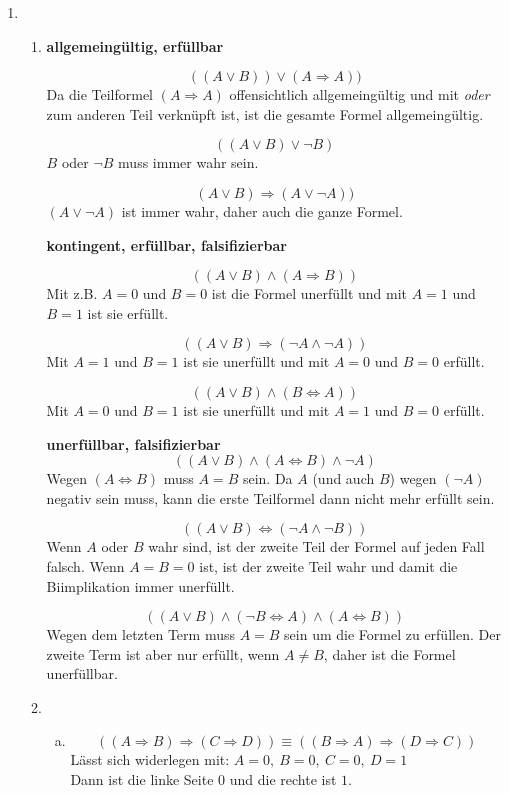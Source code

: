 \documentclass[a4paper]{scrartcl}
\title{\titleinfo}
\author{Arne Feil}
\date{\today}
\newcommand{\aufgabe}[1]{\item[\textbf{#1}]}
\begin{document}
\begin{enumerate}

\aufgabe{6.3}
\begin{enumerate}[1.]
 \item

  \textbf{allgemeingültig, erfüllbar}

  $$((A\vee B))\vee (A\Rightarrow A))$$
  Da die Teilformel $(A\Rightarrow A)$ offensichtlich allgemeingültig und mit \textit{oder} zum anderen Teil verknüpft ist, ist die gesamte Formel allgemeingültig.

  $$((A\vee B)\vee\neg B)$$
  $B$ oder $\neg B$ muss immer wahr sein.

  $$(A\vee B)\Rightarrow(A\vee\neg A))$$
  $(A\vee\neg A)$ ist immer wahr, daher auch die ganze Formel.

  \textbf{kontingent, erfüllbar, falsifizierbar}

  $$((A\vee B)\wedge(A\Rightarrow B))$$
  Mit z.B. $A=0$ und $B=0$ ist die Formel unerfüllt und mit $A=1$ und $B=1$ ist sie erfüllt.

  $$((A\vee B)\Rightarrow(\neg A\wedge \neg A))$$
  Mit $A=1$ und $B=1$ ist sie unerfüllt und mit $A=0$ und $B=0$ erfüllt.

  $$((A\vee B)\wedge(B\Leftrightarrow A))$$
  Mit $A=0$ und $B=1$ ist sie unerfüllt und mit $A=1$ und $B=0$ erfüllt.

  \textbf{unerfüllbar, falsifizierbar}
  $$((A\vee B)\wedge(A\Leftrightarrow B)\wedge\neg A)$$
  Wegen $(A\Leftrightarrow B)$ muss $A=B$ sein. Da $A$ (und auch $B$) wegen $(\neg A)$ negativ sein muss, kann die erste Teilformel dann nicht mehr erfüllt sein.

  $$((A\vee B)\Leftrightarrow(\neg A\wedge\neg B))$$
  Wenn $A$ oder $B$ wahr sind, ist der zweite Teil der Formel auf jeden Fall falsch. Wenn $A=B=0$ ist, ist der zweite Teil wahr und damit die Biimplikation immer unerfüllt.

  $$((A\vee B)\wedge(\neg B\Leftrightarrow A)\wedge(A\Leftrightarrow B))$$
  Wegen dem letzten Term muss $A=B$ sein um die Formel zu erfüllen. Der zweite Term ist aber nur erfüllt, wenn $A\neq B$, daher ist die Formel unerfüllbar.

  \item

  \begin{enumerate}[a)]
   \item
   $$((A\Rightarrow B)\Rightarrow(C\Rightarrow D))\equiv ((B\Rightarrow A)\Rightarrow(D\Rightarrow C))$$
   Lässt sich widerlegen mit: $A=0,\ B=0,\ C=0,\ D=1$\\
   Dann ist die linke Seite $0$ und die rechte ist $1$.


\end{enumerate}
\end{enumerate}
\end{enumerate}
\end{document}
